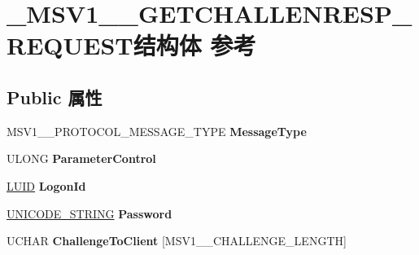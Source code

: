 \hypertarget{struct___m_s_v1__0___g_e_t_c_h_a_l_l_e_n_r_e_s_p___r_e_q_u_e_s_t}{}\section{\+\_\+\+M\+S\+V1\+\_\+\_\+\+G\+E\+T\+C\+H\+A\+L\+L\+E\+N\+R\+E\+S\+P\+\_\+\+R\+E\+Q\+U\+E\+S\+T结构体 参考}
\label{struct___m_s_v1__0___g_e_t_c_h_a_l_l_e_n_r_e_s_p___r_e_q_u_e_s_t}
\subsection*{Public 属性}
\begin{DoxyCompactItemize}
\item 
\mbox{\label{struct___m_s_v1__0___g_e_t_c_h_a_l_l_e_n_r_e_s_p___r_e_q_u_e_s_t_ad220e770729c29cf9fd5d2a7b0216a84}} 
M\+S\+V1\+\_\+\_\+\+P\+R\+O\+T\+O\+C\+O\+L\+\_\+\+M\+E\+S\+S\+A\+G\+E\+\_\+\+T\+Y\+PE {\bfseries Message\+Type}
\item 
\mbox{\label{struct___m_s_v1__0___g_e_t_c_h_a_l_l_e_n_r_e_s_p___r_e_q_u_e_s_t_a4626634279b35c23af31bd6673579456}} 
U\+L\+O\+NG {\bfseries Parameter\+Control}
\item 
\mbox{\label{struct___m_s_v1__0___g_e_t_c_h_a_l_l_e_n_r_e_s_p___r_e_q_u_e_s_t_aa4a24daf8a5a46b7eaf8dbc047dd970a}} 
\hyperlink{struct___l_u_i_d}{L\+U\+ID} {\bfseries Logon\+Id}
\item 
\mbox{\label{struct___m_s_v1__0___g_e_t_c_h_a_l_l_e_n_r_e_s_p___r_e_q_u_e_s_t_a4c3365eb0427573141196632bc08c310}} 
\hyperlink{struct___u_n_i_c_o_d_e___s_t_r_i_n_g}{U\+N\+I\+C\+O\+D\+E\+\_\+\+S\+T\+R\+I\+NG} {\bfseries Password}
\item 
\mbox{\label{struct___m_s_v1__0___g_e_t_c_h_a_l_l_e_n_r_e_s_p___r_e_q_u_e_s_t_a6edee01d34ca0f3d74ec1780020b8919}} 
U\+C\+H\+AR {\bfseries Challenge\+To\+Client} \mbox{[}M\+S\+V1\+\_\+\_\+\+C\+H\+A\+L\+L\+E\+N\+G\+E\+\_\+\+L\+E\+N\+G\+TH\mbox{]}

\end{DoxyCompactItemize}
